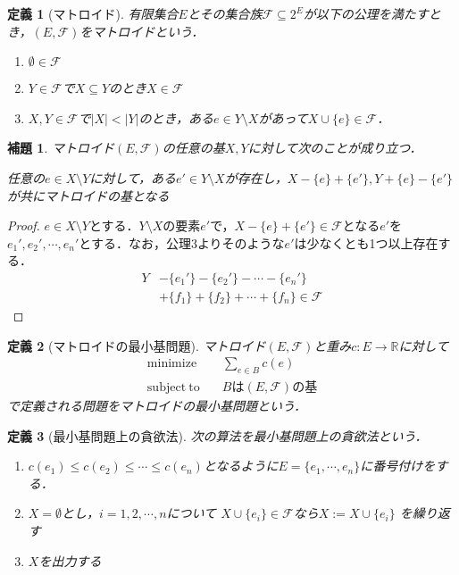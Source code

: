 \documentclass[uplatex]{jsarticle}
\newcommand{\abs}[1]{ \left| #1 \right| }
\theoremstyle{break}
\newtheorem{defi}{定義}[section]
\newtheorem{lemm}{補題}[section]
\newtheorem{proof}{証明}[section]
\begin{document}
\begin{defi}[マトロイド] 
  有限集合$E$とその集合族$\mathcal{F} \subseteq 2^E$が以下の公理を満たすとき，$(E,\mathcal{F})$をマトロイドという．
  \begin{enumerate}
    \item $\emptyset \in \mathcal{F}$
    \item $Y\in \mathcal{F}$で$X\subseteq Y$のとき$X\in \mathcal{F}$
    \item $X,Y\in \mathcal{F}$で$\abs{X}<\abs{Y}$のとき，ある$e\in Y\setminus X$があって$X\cup \{e\} \in \mathcal{F}$．
  \end{enumerate}
\end{defi}

\begin{lemm}
  マトロイド$(E,\mathcal{F})$の任意の基$X,Y$に対して次のことが成り立つ．

  任意の$e\in X\setminus Y$に対して，ある$e'\in Y\setminus X$が存在し，$X-\{e\}+\{e'\},Y+\{e\}-\{e'\}$が共にマトロイドの基となる
\end{lemm}
\begin{proof}
  $e\in X\setminus Y$とする．$Y\setminus X$の要素$e'$で，$X-\{e\}+\{e'\}\in \mathcal{F}$となる$e'$を$e_1',e_2',\cdots,e_n'$とする．なお，公理3よりそのような$e'$は少なくとも1つ以上存在する．
  \begin{align*}
    Y &- \{e_1'\} - \{e_2'\} - \cdots - \{e_n'\}  \\
      & + \{f_1\} + \{f_2\} + \cdots + \{f_n\} \in \mathcal{F}
  \end{align*}
\end{proof}

\begin{defi}[マトロイドの最小基問題] 
  マトロイド$(E,\mathcal{F})$と重み$c\colon E\to \mathbb{R}$に対して
  \begin{align*}
    \mathrm{minimize} &\quad  \sum_{e\in B} c(e) \\
    \mathrm{subject\ to}  &\quad  Bは(E,\mathcal{F})の基
  \end{align*}
  で定義される問題をマトロイドの最小基問題という．
\end{defi}
\begin{defi}[最小基問題上の貪欲法] 
  次の算法を最小基問題上の貪欲法という．
  \begin{enumerate}
    \item $c(e_1) \leq c(e_2) \leq \cdots \leq c(e_n)$となるように$E=\{e_1,\cdots,e_n\}$に番号付けをする．
    \item $X=\emptyset$とし，$i=1,2,\cdots,n$について
      $X\cup \{e_i\} \in \mathcal{F}$なら$X:=X\cup \{e_i\}$
      を繰り返す
    \item $X$を出力する
  \end{enumerate}
\end{defi}
\end{document}
